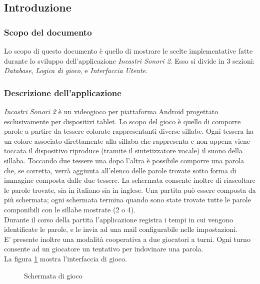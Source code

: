 


\subsection{Introduzione}


\subsubsection{Scopo del documento}
Lo scopo di questo documento è quello di mostrare le scelte implementative fatte durante lo sviluppo dell'applicazione \textit{Incastri Sonori 2}. Esso si divide in $3$ sezioni: \textit{Database}, \textit{Logica di gioco}, e \textit{Interfaccia Utente}.

\subsubsection{Descrizione dell'applicazione}
\textit{Incastri Sonori 2} è un videogioco per piattaforma Android progettato esclusivamente per dispositivi tablet. Lo scopo del gioco è quello di comporre parole a partire da tessere colorate rappresentanti diverse sillabe. Ogni tessera ha un colore associato direttamente alla sillaba che rappresenta e non appena viene toccata il dispositivo riproduce (tramite il sintetizzatore vocale) il suono della sillaba. Toccando due tessere una dopo l'altra è possibile comporre una parola che, se corretta, verrà aggiunta all'elenco delle parole trovate sotto forma di immagine composta dalle due tessere. La schermata consente inoltre di riascoltare le parole trovate, sia in italiano sia in inglese. Una partita può essere composta da più schermata; ogni schermata termina quando sono state trovate tutte le parole componibili con le sillabe mostrate (2 o 4).\\
Durante il corso della partita l'applicazione registra i tempi in cui vengono identificate le parole, e le invia ad una mail configurabile nelle impostazioni.\\
E' presente inoltre una modalità cooperativa a due giocatori a turni. Ogni turno consente ad un giocatore un tentativo per indovinare una parola.\\
La figura \ref{fig:play_ui} mostra l'interfaccia di gioco.

\begin{figure}[h!]
\label{fig:play_ui}
  \centering
  \caption{Schermata di gioco}
\end{figure}
